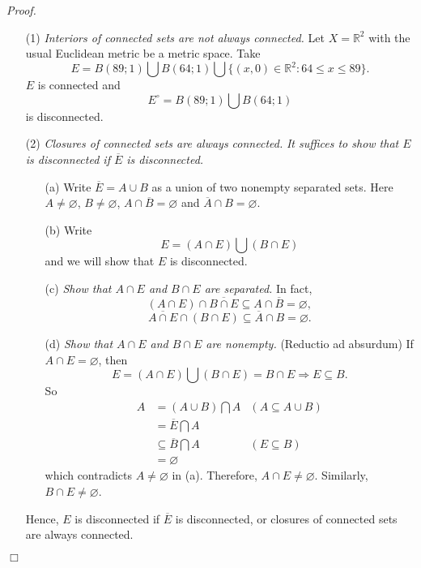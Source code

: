 \documentclass{article}
\begin{document}
\emph{Proof.}
\begin{enumerate}
\item[(1)]
\emph{Interiors of connected sets are not always connected.}
Let $X = \mathbb{R}^2$ with the usual Euclidean metric be a metric space.
Take
$$E = B(89;1) \bigcup B(64;1) \bigcup \{ (x,0) \in \mathbb{R}^2 : 64 \leq x \leq 89 \}.$$
$E$ is connected and
$$E^{\circ} = B(89;1) \bigcup B(64;1)$$
is disconnected.
\item[(2)]
\emph{Closures of connected sets are always connected.}
\emph{It suffices to show that
$E$ is disconnected if $\overline{E}$ is disconnected.}
  \begin{enumerate}
  \item[(a)]
  Write $\overline{E} = A \cup B$ as a union of two nonempty separated sets.
  Here $A \neq \varnothing$, $B \neq \varnothing$,
  $A \cap \overline{B} = \varnothing$ and $\overline{A} \cap B = \varnothing$.
  \item[(b)]
  Write
  $$E = (A \cap E) \bigcup (B \cap E)$$
  and we will show that $E$ is disconnected.
  \item[(c)]
  \emph{Show that $A \cap E$ and $B \cap E$ are separated.}
  In fact,
  $$(A \cap E) \cap \overline{B \cap E}
  \subseteq A \cap \overline{B} = \varnothing,$$
  $$\overline{A \cap E} \cap (B \cap E)
  \subseteq \overline{A} \cap B = \varnothing.$$
  \item[(d)]
  \emph{Show that $A \cap E$ and $B \cap E$ are nonempty.}
  (Reductio ad absurdum)
  If $A \cap E = \varnothing$, then
  $$E = (A \cap E) \bigcup (B \cap E) = B \cap E \Longrightarrow E \subseteq B.$$
  So
  \begin{align*}
  A &= (A \cup B) \bigcap A
    &(A \subseteq A \cup B) \\
  &= \overline{E} \bigcap A \\
  &\subseteq \overline{B} \bigcap A
    &(E \subseteq B) \\
  &= \varnothing
  \end{align*}
  which contradicts $A \neq \varnothing$ in (a).
  Therefore, $A \cap E \neq \varnothing$.
  Similarly, $B \cap E \neq \varnothing$.
  \end{enumerate}
Hence, $E$ is disconnected if $\overline{E}$ is disconnected,
or closures of connected sets are always connected.
\end{enumerate}
$\Box$ \\\\



\end{document}
